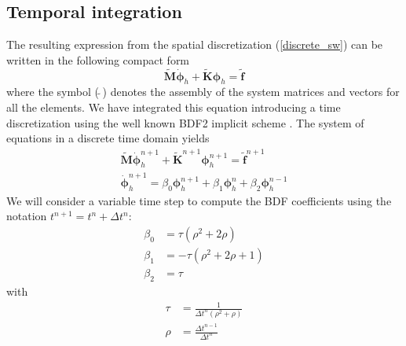 \subsection{Temporal integration}
\label{sec:time_integration_bdf}

The resulting expression from the spatial discretization (\ref{discrete_sw}) can be written in the following compact form 
\begin{equation} \label{discrete_compact}
\tilde{\mathbf{M}}\dot{\bm{\phi}}_h + \tilde{\mathbf{K}}\bm{\phi}_h = \tilde{\mathbf{f}}
\end{equation}
where the symbol ($\,\tilde{}\,$) denotes the assembly of the system matrices and vectors for all the elements.
We have integrated this equation introducing a time discretization using the well known BDF2 implicit scheme \cite{curtiss1952,brayton1972}. The system of equations in a discrete time domain yields
\begin{equation}
\begin{split} \label{discrete_bdf2}
\tilde{\mathbf{M}}\dot{\bm{\phi}}_h^{n+1} + \tilde{\mathbf{K}}^{n+1}\bm{\phi}_h^{n+1} = \tilde{\mathbf{f}}^{n+1} \\
\dot{\bm{\phi}}_h^{n+1} = \beta_0 \bm{\phi}_h^{n+1} + \beta_1 \bm{\phi}_h^n + \beta_2 \bm{\phi}_h^{n-1}
\end{split}
\end{equation}
We will consider a variable time step to compute the BDF coefficients using the notation $t^{n+1} = t^n + \Delta t^n$:
\begin{equation}
\begin{split}
\beta_0 &= \tau (\rho^2 + 2\rho) \\
\beta_1 &= -\tau (\rho^2 + 2\rho + 1) \\
\beta_2 &= \tau
\end{split}
\end{equation}
with
\begin{equation}
\begin{split}
\tau &= \frac{1}{\Delta t^n(\rho^2 + \rho)} \\
\rho &= \frac{\Delta t^{n-1}}{\Delta t^n}
\end{split}
\end{equation}

